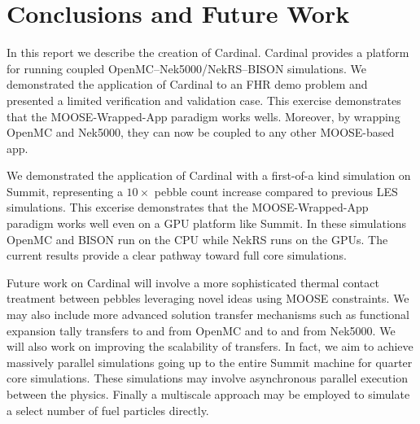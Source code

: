 
\section{Conclusions and Future Work}
\label{s:sum}


In this report we describe the creation of Cardinal. Cardinal provides a platform for running coupled
OpenMC--Nek5000/NekRS--BISON simulations. We demonstrated the application of Cardinal to an FHR demo problem and
presented a limited verification and validation case. This exercise demonstrates that the MOOSE-Wrapped-App
paradigm works wells. Moreover, by wrapping OpenMC and Nek5000, they can now be coupled to any other MOOSE-based app.

We demonstrated the application of Cardinal with a first-of-a kind simulation on Summit, representing a $10\times$ pebble count increase compared to previous LES simulations. This excerise demonstrates that the MOOSE-Wrapped-App paradigm works well even on a GPU platform like Summit. In these simulations OpenMC and BISON run on the CPU while NekRS runs on the GPUs. The current results provide a clear pathway toward full core simulations.

Future work on Cardinal will involve a more sophisticated thermal contact treatment between pebbles
leveraging novel ideas using MOOSE constraints. We may also include more advanced solution transfer
mechanisms such as functional expansion tally transfers to and from OpenMC and to and from Nek5000. We
will also work on improving the scalability of transfers. In fact, we aim to achieve massively parallel simulations going up to the entire Summit machine
for quarter core simulations. These simulations may involve asynchronous parallel execution between the
physics. Finally a multiscale approach may be employed to simulate a select number of fuel particles directly.
